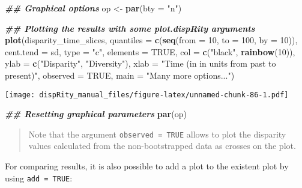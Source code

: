 \documentclass[
]{book}
\newenvironment{Shaded}{\begin{snugshade}}{\end{snugshade}}
\newcommand{\AttributeTok}[1]{\textcolor[rgb]{0.13,0.29,0.53}{#1}}
\newcommand{\ConstantTok}[1]{\textcolor[rgb]{0.56,0.35,0.01}{#1}}
\newcommand{\DecValTok}[1]{\textcolor[rgb]{0.00,0.00,0.81}{#1}}
\newcommand{\DocumentationTok}[1]{\textcolor[rgb]{0.56,0.35,0.01}{\textbf{\textit{#1}}}}
\newcommand{\FunctionTok}[1]{\textcolor[rgb]{0.13,0.29,0.53}{\textbf{#1}}}
\newcommand{\NormalTok}[1]{#1}
\newcommand{\OtherTok}[1]{\textcolor[rgb]{0.56,0.35,0.01}{#1}}
\newcommand{\StringTok}[1]{\textcolor[rgb]{0.31,0.60,0.02}{#1}}
\begin{document}
\begin{Shaded}
\begin{Highlighting}[]
\DocumentationTok{\#\# Graphical options}
\NormalTok{op }\OtherTok{\textless{}{-}} \FunctionTok{par}\NormalTok{(}\AttributeTok{bty =} \StringTok{"n"}\NormalTok{)}

\DocumentationTok{\#\# Plotting the results with some plot.dispRity arguments}
\FunctionTok{plot}\NormalTok{(disparity\_time\_slices,}
    \AttributeTok{quantiles =} \FunctionTok{c}\NormalTok{(}\FunctionTok{seq}\NormalTok{(}\AttributeTok{from =} \DecValTok{10}\NormalTok{, }\AttributeTok{to =} \DecValTok{100}\NormalTok{, }\AttributeTok{by =} \DecValTok{10}\NormalTok{)),}
    \AttributeTok{cent.tend =}\NormalTok{ sd, }\AttributeTok{type =} \StringTok{"c"}\NormalTok{, }\AttributeTok{elements =} \ConstantTok{TRUE}\NormalTok{,}
    \AttributeTok{col =} \FunctionTok{c}\NormalTok{(}\StringTok{"black"}\NormalTok{, }\FunctionTok{rainbow}\NormalTok{(}\DecValTok{10}\NormalTok{)),}
    \AttributeTok{ylab =} \FunctionTok{c}\NormalTok{(}\StringTok{"Disparity"}\NormalTok{, }\StringTok{"Diversity"}\NormalTok{),}
    \AttributeTok{xlab =} \StringTok{"Time (in in units from past to present)"}\NormalTok{,}
    \AttributeTok{observed =} \ConstantTok{TRUE}\NormalTok{,}
    \AttributeTok{main =} \StringTok{"Many more options..."}\NormalTok{)}
\end{Highlighting}
\end{Shaded}

\texttt{[image: dispRity\_manual\_files/figure-latex/unnamed-chunk-86-1.pdf]}

\begin{Shaded}
\begin{Highlighting}[]
\DocumentationTok{\#\# Resetting graphical parameters}
\FunctionTok{par}\NormalTok{(op)}
\end{Highlighting}
\end{Shaded}

\begin{quote}
Note that the argument \texttt{observed\ =\ TRUE} allows to plot the disparity values calculated from the non-bootstrapped data as crosses on the plot.
\end{quote}

For comparing results, it is also possible to add a plot to the existent plot by using \texttt{add\ =\ TRUE}:
\end{document}
